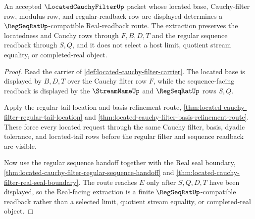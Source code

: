 \begin{theorem}
\label{thm:located-cauchy-filter-real-extraction}
An accepted $\LocatedCauchyFilterUp$ packet whose located base, Cauchy-filter row, modulus row, and regular-readback row are displayed determines a $\RegSeqRatUp$-compatible Real-readback route. The extraction preserves the locatedness and Cauchy rows through $F,B,D,T$ and the regular sequence readback through $S,Q$, and it does not select a host limit, quotient stream equality, or completed-real object.
\end{theorem}
\begin{proof}
Read the carrier of \autoref{def:located-cauchy-filter-carrier}. The located base is displayed by $B,D,T$ over the Cauchy filter row $F$, while the sequence-facing readback is displayed by the $\StreamNameUp$ and $\RegSeqRatUp$ rows $S,Q$.

Apply the regular-tail location and basis-refinement route, \autoref{thm:located-cauchy-filter-regular-tail-location} and \autoref{thm:located-cauchy-filter-basis-refinement-route}. These force every located request through the same Cauchy filter, basis, dyadic tolerance, and located-tail rows before the regular filter and sequence readback are visible.

Now use the regular sequence handoff together with the Real seal boundary, \autoref{thm:located-cauchy-filter-regular-sequence-handoff} and \autoref{thm:located-cauchy-filter-real-seal-boundary}. The route reaches $E$ only after $S,Q,D,T$ have been displayed, so the Real-facing extraction is a finite $\RegSeqRatUp$-compatible readback rather than a selected limit, quotient stream equality, or completed-real object.
\end{proof}


